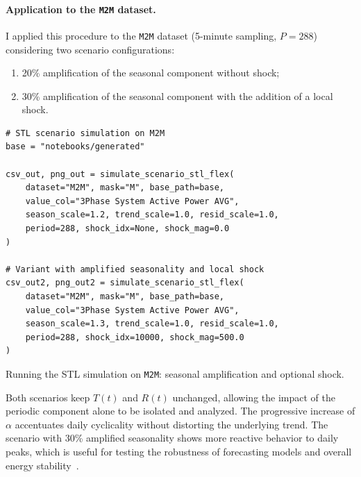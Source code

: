 \paragraph{Application to the \texttt{M2M} dataset.}
I applied this procedure to the \texttt{M2M} dataset (5-minute sampling, $P = 288$) considering two scenario configurations:
\begin{enumerate}
  \item 20\% amplification of the seasonal component without shock;
  \item 30\% amplification of the seasonal component with the addition of a local shock.
\end{enumerate}

\begin{listing}[H]
\begin{verbatim}
# STL scenario simulation on M2M
base = "notebooks/generated"

csv_out, png_out = simulate_scenario_stl_flex(
    dataset="M2M", mask="M", base_path=base,
    value_col="3Phase System Active Power AVG",
    season_scale=1.2, trend_scale=1.0, resid_scale=1.0,
    period=288, shock_idx=None, shock_mag=0.0
)

# Variant with amplified seasonality and local shock
csv_out2, png_out2 = simulate_scenario_stl_flex(
    dataset="M2M", mask="M", base_path=base,
    value_col="3Phase System Active Power AVG",
    season_scale=1.3, trend_scale=1.0, resid_scale=1.0,
    period=288, shock_idx=10000, shock_mag=500.0
)
\end{verbatim}
\caption{Running the STL simulation on \texttt{M2M}: seasonal amplification and optional shock.}
\label{lst:scenario_stl_launch}
\end{listing}

Both scenarios keep $T(t)$ and $R(t)$ unchanged, allowing the impact of the periodic component alone to be isolated and analyzed.  
The progressive increase of $\alpha$ accentuates daily cyclicality without distorting the underlying trend.  
The scenario with 30\% amplified seasonality shows more reactive behavior to daily peaks, which is useful for testing the robustness of forecasting models and overall energy stability~\cite{box2015time,shumway2017time, cleveland1990stl}.

